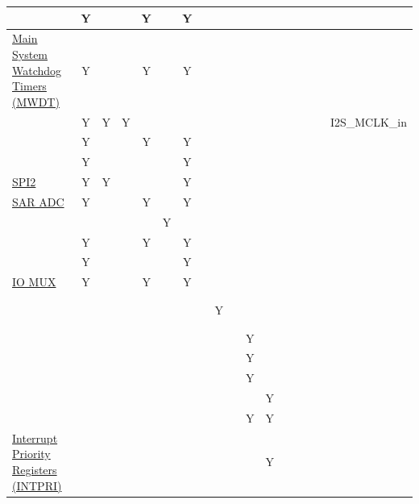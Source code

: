 \documentclass[main\_\_EN.tex]{subfiles}
\begin{document}
\begin{landscape}
\begin{tiny}
\begin{longtable}[c]{|m{3cm}|c|c|c|c|c|c|C{1.4cm}|c|c|c|c|c|c|c|c|c| }
     & Y &  &  & Y &  & Y &  &  &  &  &  &  &  &  &  &    \\ \hline
    \hyperref[mod:wdt]{Main System Watchdog Timers (MWDT)} & Y &  &  & Y &  & Y &  &  &  &  &  &  &  &  &  &    \\ \hline
     & Y & Y & Y &  &  &  &  &  &  &  &    &  &  &  &  & I2S\_MCLK\_in \\ \hline
     & Y &   &  & Y &  & Y &  &  &  &  &    &  &  &  &  &  \\ \hline
     & Y &  &  &  &  & Y &  &  &  &  &  &  &  &  &  &  \\ \hline
    \hyperref[mod:spi]{SPI2} & Y  & Y &  &  &  & Y &  &  &  &  &  &  &  &  &  &  \\ \hline
    \hyperref[mod:adc]{SAR ADC}  & Y  &  &  & Y &  & Y &  &  &  &  &  &  &  &  &  &  \\ \hline
     &   &  &  &  & Y &  &  &  &  &  &  &  &  &  &  &  \\ \hline
     & Y &  &  & Y &  & Y &  &  &  &  &  &  &  &  &  &  \\ \hline
     & Y &  &  &  &  & Y &  &  &  &  &  &  &  &  &  &  \\ \hline
    \hyperref[mod:iomuxgpio]{IO MUX} & Y  &  &  & Y &  & Y &  &  &  &  &  &  &  &  &  &  \\ \hline
     &   &  &  &  &  &  &  &  Y &  &  &  &  &  &  &  &  \\ \hline
     &   &  &  &  &  &  &  &  &  &  Y &  &  &  &  &  &  \\ \hline
     &   &  &  &  &  &  &  &  &  &  Y &  &  &  &  &  &  \\ \hline
     &   &  &  &  &  &  &  &  &  &  Y &  &  &  &  &  &  \\ \hline
     &   &  &  &  &  &  &  &  &  &  &  Y &  &  &  &  &  \\ \hline
      &  &  &  &  &  &  &  &  &  & Y & Y &  &  &  &  &  \\ \hline
    \hyperref[mod:riscvcpu]{Interrupt Priority Registers (INTPRI)} &   &  &  &  &  &  &  &  &  &  & Y &  &  &  &  &  \\ \hline
\end{longtable}



\end{tiny}
\end{landscape}
\end{document}
